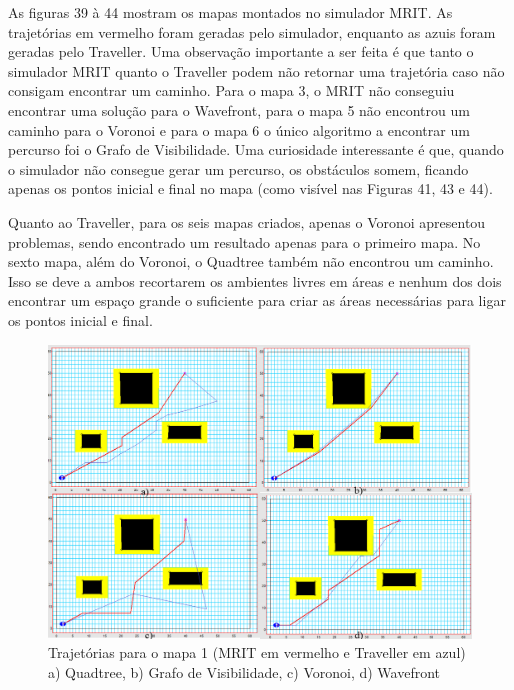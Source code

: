 As figuras 39 à 44 mostram os mapas montados no simulador MRIT. As trajetórias em vermelho foram geradas pelo simulador, enquanto as azuis foram geradas pelo Traveller. Uma observação importante a ser feita é que tanto o simulador MRIT quanto o Traveller podem não retornar uma trajetória caso não consigam encontrar um caminho. Para o mapa 3, o MRIT não conseguiu encontrar uma solução para o Wavefront, para o mapa 5 não encontrou um caminho para o Voronoi e para o mapa 6 o único algoritmo a encontrar um percurso foi o Grafo de Visibilidade. Uma curiosidade interessante é que, quando o simulador não consegue gerar um percurso, os obstáculos somem, ficando apenas os pontos inicial e final no mapa (como visível nas Figuras 41, 43 e 44).

Quanto ao Traveller, para os seis mapas criados, apenas o Voronoi apresentou problemas, sendo encontrado um resultado apenas para o primeiro mapa. No sexto mapa, além do Voronoi, o Quadtree também não encontrou um caminho. Isso se deve a ambos recortarem os ambientes livres em áreas e nenhum dos dois encontrar um espaço grande o suficiente para criar as áreas necessárias para ligar os pontos inicial e final.

\begin{figure}[h]
	\centering
	\label{fig39}
		\includegraphics[keepaspectratio=true,scale=0.25]{figuras/mapa1.jpg}
	\caption{Trajetórias para o mapa 1 (MRIT em vermelho e Traveller em azul) a) Quadtree, b) Grafo de Visibilidade, c) Voronoi, d) Wavefront}
\end{figure}

